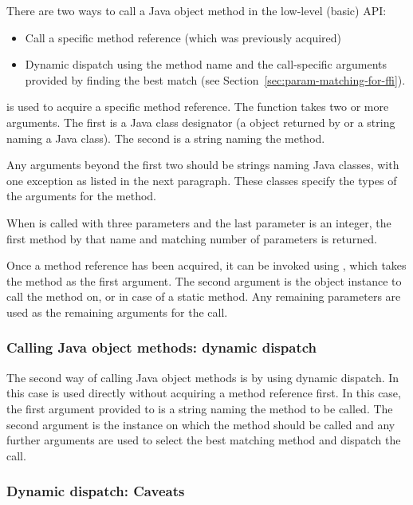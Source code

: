 \documentclass[10pt]{book}
\begin{document}
There are two ways to call a Java object method in the low-level (basic) API:

\begin{itemize}
\item Call a specific method reference (which was previously acquired)
\item Dynamic dispatch using the method name and the call-specific
  arguments provided by finding the best match (see
  Section~\ref{sec:param-matching-for-ffi}).
\end{itemize}

 is used to acquire a specific method reference.  The
function takes two or more arguments. The first is a Java class
designator (a  object returned by
 or a string naming a Java class). The second is a
string naming the method.

Any arguments beyond the first two should be strings naming Java
classes, with one exception as listed in the next paragraph. These
classes specify the types of the arguments for the method.

When  is called with three parameters and the last
parameter is an integer, the first method by that name and matching
number of parameters is returned.

Once a method reference has been acquired, it can be invoked using
, which takes the method as the first argument. The
second argument is the object instance to call the method on, or
 in case of a static method.  Any remaining parameters are
used as the remaining arguments for the call.

\subsubsection{Calling Java object methods: dynamic dispatch}

The second way of calling Java object methods is by using dynamic dispatch.
In this case  is used directly without acquiring a method
reference first. In this case, the first argument provided to 
is a string naming the method to be called. The second argument is the instance
on which the method should be called and any further arguments are used to
select the best matching method and dispatch the call.

\subsubsection{Dynamic dispatch: Caveats}
\end{document}
